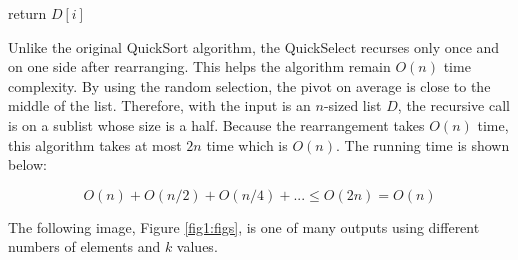 \documentclass[12pt,english,]{article}
\let\origfigure\figure
\let\endorigfigure\endfigure
\renewenvironment{figure}[1][2] {
    \expandafter\origfigure\expandafter[H]
} {
    \endorigfigure
}
\begin{document}
\begin{figure}[ht]
  \centering
  \begin{minipage}{.9\linewidth}
    {\LinesNotNumbered
    \SetAlgoRefName{}
    \begin{algorithm}[H]
    \SetAlgoLined
    \BlankLine
    \centering
    \begin{minipage}{.75\linewidth}
         {
            return $D[i]$
        }
    \end{minipage}
    \caption{\textsc{KthSmallest}$(D, a, b, k)$}
    \end{algorithm}}
  \end{minipage}
\end{figure}

Unlike the original QuickSort algorithm, the QuickSelect recurses only
once and on one side after rearranging. This helps the algorithm remain
\(O(n)\) time complexity. By using the random selection, the pivot on
average is close to the middle of the list. Therefore, with the input is
an \(n\)-sized list \(D\), the recursive call is on a sublist whose size
is a half. Because the rearrangement takes \(O(n)\) time, this algorithm
takes at most \(2n\) time which is \(O(n)\). The running time is shown
below:

\[O(n) + O(n/2) + O(n/4) +... \leq O(2n) = O(n)\]

The following image, Figure \ref{fig1:figs}, is one of many outputs
using different numbers of elements and \(k\) values.
\end{document}
